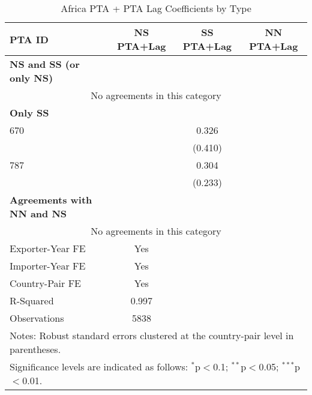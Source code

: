 \begin{table}[htbp]
    \centering
    \caption{Africa PTA + PTA Lag Coefficients by Type}
    \label{tab:africa_pta}
    \begin{adjustbox}{max width=\textwidth}
    \begin{tabular}{lccc}
    \hline
    \textbf{PTA ID} & \textbf{NS PTA+Lag} & \textbf{SS PTA+Lag} & \textbf{NN PTA+Lag} \\
    \hline
    \textbf{NS and SS (or only NS)} &  &  &  \\
    \hline
    \multicolumn{4}{c}{No agreements in this category} \\
    \hline
    \textbf{Only SS} &  &  &  \\
    \hline
    670 &  & 0.326 &  \\
     &  & (0.410) &  \\
    787 &  & 0.304 &  \\
     &  & (0.233) &  \\
    \hline
    \textbf{Agreements with NN and NS} &  &  &  \\
    \hline
    \multicolumn{4}{c}{No agreements in this category} \\
    \hline
    Exporter-Year FE & Yes \\
    Importer-Year FE & Yes \\
    Country-Pair FE & Yes \\
    R-Squared & 0.997 \\
    Observations & 5838 \\
    \hline
    \multicolumn{4}{l}{\footnotesize{Notes: Robust standard errors clustered at the country-pair level in parentheses.}} \\
    \multicolumn{4}{l}{\footnotesize{Significance levels are indicated as follows: $^{\ast}$p$<$0.1; $^{\ast\ast}$p$<$0.05; $^{\ast\ast\ast}$p$<$0.01.}} \\
    \end{tabular}
    \end{adjustbox}
\end{table}
